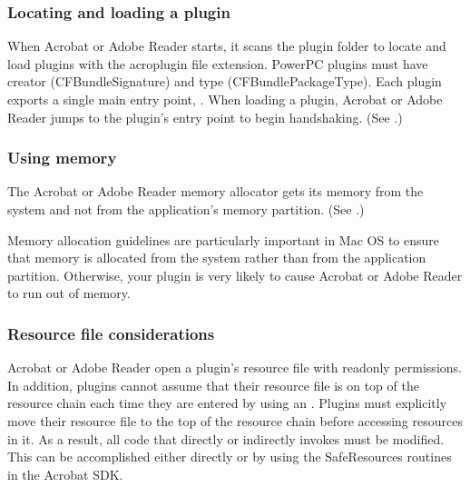 \documentclass[letterpaper,12pt,english,openany,oneside]{sphinxmanual}
\begin{document}
\subsubsection{Locating and loading a plugin}
\label{\detokenize{Plugins_CreatingSimplePlug:locating-and-loading-a-plugin}}\label{\detokenize{Plugins_CreatingSimplePlug:locating-and-loading-plugins-1}}
When Acrobat or Adobe Reader starts, it scans the plugin folder to locate and load plugins with the acroplugin file extension. PowerPC plugins must have creator  (CFBundleSignature) and type  (CFBundlePackageType). Each plugin exports a single main entry point, . When loading a plugin, Acrobat or Adobe Reader jumps to the plugin’s entry point to begin handshaking. (See .)


\subsubsection{Using memory}
\label{\detokenize{Plugins_CreatingSimplePlug:using-memory}}
The Acrobat or Adobe Reader memory allocator gets its memory from the system and not from the application’s memory partition. (See .)

Memory allocation guidelines are particularly important in Mac OS to ensure that memory is allocated from the system rather than from the application partition. Otherwise, your plugin is very likely to cause Acrobat or Adobe Reader to run out of memory.


\subsubsection{Resource file considerations}
\label{\detokenize{Plugins_CreatingSimplePlug:resource-file-considerations}}
Acrobat or Adobe Reader open a plugin’s resource file with read\sphinxhyphen{}only permissions. In addition, plugins cannot assume that their resource file is on top of the resource chain each time they are entered by using an . Plugins must explicitly move their resource file to the top of the resource chain before accessing resources in it. As a result, all code that directly or indirectly invokes  must be modified. This can be accomplished either directly or by using the SafeResources routines in the Acrobat SDK.
\end{document}
